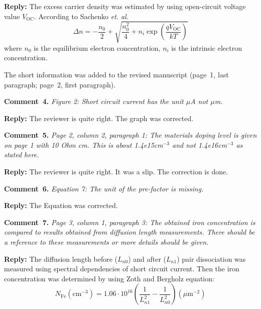 \documentclass[aip,jap,preprint]{revtex4-1}
\begin{document}
\noindent
\textcolor[rgb]{0.51,0.00,0.00}{\textbf{Reply:}}
The excess carrier density was estimated by using open-circuit voltage value $V_\mathrm{OC}$.
According to Sachenko \emph{et. al.}\cite{JAPSach}
\begin{equation}
  \Delta n=-\frac{n_0}{2}+\sqrt{\frac{n_0^2}{4}+n_i\exp\left(\frac{qV_\mathrm{OC}}{kT}\right)}
\end{equation}
where
$n_0$ is the equilibrium electron concentration,
$n_i$ is the intrinsic electron concentration.

The short information was added to the revised manuscript (page~1, last paragraph; page~2, first paragraph).


\vspace{1cm}
\noindent
\textcolor[rgb]{0.00,0.50,1.00}{\textbf{Comment~4.}}
\emph{Figure 2: Short circuit current has the unit $\mu$A not $\mu$m.}

\noindent
\textcolor[rgb]{0.51,0.00,0.00}{\textbf{Reply:}}
The reviewer is quite right.
The graph was corrected.


\vspace{1cm}
\noindent
\textcolor[rgb]{0.00,0.50,1.00}{\textbf{Comment~5.}}
\emph{Page 2, column 2, paragraph 1: The materials doping level is given on page 1 with 10 Ohm cm. This is about 1.4e15cm$^{-3}$ and not 1.4e16cm$^{-3}$ as stated here.}

\noindent
\textcolor[rgb]{0.51,0.00,0.00}{\textbf{Reply:}}
The reviewer is quite right.
It was a slip.
The correction is done.


\vspace{1cm}
\noindent
\textcolor[rgb]{0.00,0.50,1.00}{\textbf{Comment~6.}}
\emph{Equation 7: The unit of the pre-factor is missing. }

\noindent
\textcolor[rgb]{0.51,0.00,0.00}{\textbf{Reply:}}
The Equation was corrected.

\vspace{1cm}
\noindent
\textcolor[rgb]{0.00,0.50,1.00}{\textbf{Comment~7.}}
\emph{Page 3, column 1, paragraph 3: The obtained iron concentration is compared to results obtained from diffusion length measurements. There should be a reference to these measurements or more details should be given.}

\noindent
\textcolor[rgb]{0.51,0.00,0.00}{\textbf{Reply:}}
The diffusion length before ($L_{n0}$) and after ($L_{n1}$) pair dissociation was measured using spectral dependencies of short circuit current\cite{LnIscMethod}.
Then the iron concentration was determined by using Zoth and Bergholz\cite{FeB_Zong} equation:
\begin{equation}
  N_\mathrm{Fe}(\mathrm{cm}^{-3})=1.06\cdot10^{16}\left(\frac{1}{L_{n1}^2}-\frac{1}{L_{n0}^2}\right)(\mu\mathrm{m}^{-2})
\end{equation}
\end{document}
